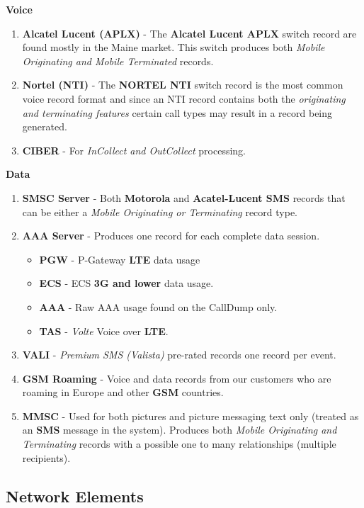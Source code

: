\documentclass[12pt,twoside]{article}
\begin{document}
\textbf{Voice}
\begin{enumerate}
\item \textbf{Alcatel Lucent (APLX)} - The \textbf{Alcatel Lucent APLX} switch record
are found mostly in the Maine market. This switch produces both
\emph{Mobile Originating and Mobile Terminated} records.
\item \textbf{Nortel (NTI)} - The \textbf{NORTEL NTI} switch record is the most common
voice record format and since an NTI record contains both the
\emph{originating and terminating features} certain call types may
result in a record being generated.
\item \textbf{CIBER} - For \emph{InCollect and OutCollect} processing.\\
\end{enumerate}

\textbf{Data}
\begin{enumerate}
\item \textbf{SMSC Server} - Both \textbf{Motorola} and \textbf{Acatel-Lucent SMS} records
that can be either a \emph{Mobile Originating or Terminating} record
type.
\item \textbf{AAA Server} - Produces one record for each complete data session.
\begin{itemize}
\item \textbf{PGW} - P-Gateway \textbf{LTE} data usage
\item \textbf{ECS} - ECS \textbf{3G and lower} data usage.
\item \textbf{AAA} - Raw AAA usage found on the CallDump only.
\item \textbf{TAS} - \emph{Volte} Voice over \textbf{LTE}.
\end{itemize}
\item \textbf{VALI} - \emph{Premium SMS (Valista)} pre-rated records one record per
event.
\item \textbf{GSM Roaming} - Voice and data records from our customers who are
roaming in Europe and other \textbf{GSM} countries.
\item \textbf{MMSC} - Used for both pictures and picture messaging text only
(treated as an \textbf{SMS} message in the system). Produces both \emph{Mobile
Originating and Terminating} records with a possible one to many
relationships (multiple recipients).\\
\end{enumerate}
\newpage
\subsection{Network Elements}
\label{sec:orgheadline18}
\footnotesize
\end{document}
